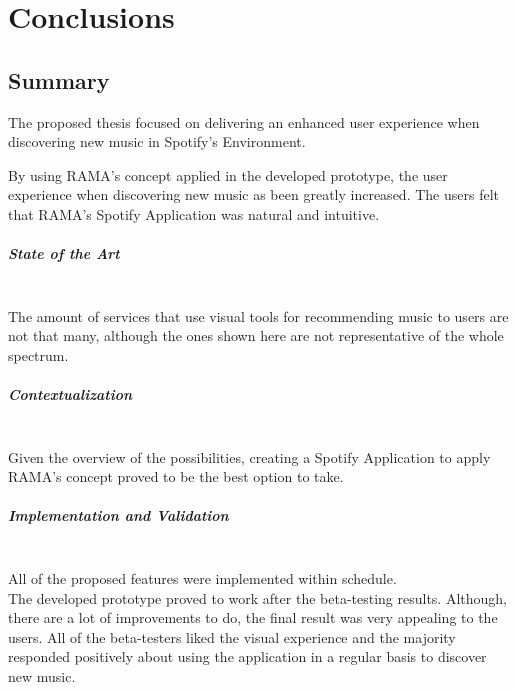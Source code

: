 
\chapter{Conclusions}
\label{chap:chap5}

\section*{}


\section{Summary} %
\label{sec:summary}

  The proposed thesis focused on delivering an enhanced user experience when discovering new music in Spotify's Environment.

  By using RAMA's concept applied in the developed prototype, the user experience when discovering new music as been greatly increased.
  The users felt that RAMA's Spotify Application was natural and intuitive.

  \paragraph*{State of the Art} \hfill \\
  \indent The amount of services that use visual tools for recommending music to users are not that many, although the ones shown here are not representative of the whole spectrum.

  \paragraph*{Contextualization} \hfill \\
  \indent Given the overview of the possibilities, creating a Spotify Application to apply RAMA's concept proved to be the best option to take.

  \paragraph*{Implementation and Validation} \hfill \\
  \indent All of the proposed features were implemented within schedule. \\
  The developed prototype proved to work after the beta-testing results.
  Although, there are a lot of improvements to do, the final result was very appealing to the users.
  All of the beta-testers liked the visual experience and the majority responded positively about using the application in a regular basis to discover new music. \\

